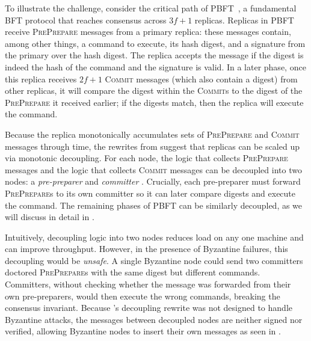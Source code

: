 To illustrate the challenge, consider the critical path of PBFT~\cite{pbft}, a fundamental BFT protocol that reaches consensus across $3f+1$ replicas.
Replicas in PBFT receive \textsc{PrePrepare} messages from a primary replica: these messages contain, among other things, a command to execute, its hash digest, and a signature from the primary over the hash digest.
The replica accepts the message if the digest is indeed the hash of the command and the signature is valid.
In a later phase, once this replica receives $2f+1$ \textsc{Commit} messages (which also contain a digest) from other replicas, it will compare the digest within the \textsc{Commit}s to the digest of the \textsc{PrePrepare} it received earlier; if the digests match, then the replica will execute the command.

Because the replica monotonically accumulates sets of \textsc{PrePrepare} and \textsc{Commit} messages through time, the rewrites from \sigmodpaper{} suggest that replicas can be scaled up via monotonic decoupling.
For each node, the logic that collects \textsc{PrePrepare} messages and the logic that collects \textsc{Commit} messages can be decoupled into two nodes: a \emph{pre-preparer} and \emph{committer} .
Crucially, each pre-preparer  must forward \textsc{PrePrepare}s to its own committer so it can later compare digests and execute the command.
The remaining phases of PBFT can be similarly decoupled, as we will discuss in detail in .

Intuitively, decoupling logic into two nodes reduces load on any one machine and can improve throughput.
However, in the presence of Byzantine failures, this decoupling would be \emph{unsafe}.
A single Byzantine node could  send two committers doctored \textsc{PrePrepare}s with the same digest but different commands.
Committers, without checking whether the message was forwarded from their own pre-preparers, would then execute the wrong commands, breaking the consensus invariant.
Because \sigmodpaper{}'s decoupling rewrite was not designed to handle Byzantine attacks, the messages between decoupled nodes are neither signed nor verified, allowing Byzantine nodes to insert their own messages as seen in .


